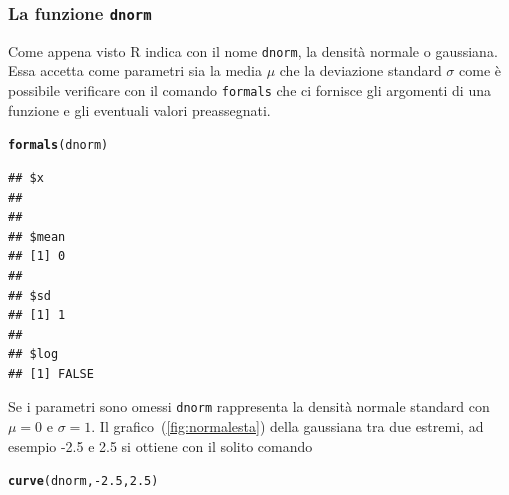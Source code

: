 \documentclass[onecolumn,12pt]{book}\usepackage[]{graphicx}\usepackage[]{color}
\makeatletter
\newcommand{\hlnum}[1]{\textcolor[rgb]{0.686,0.059,0.569}{#1}}%
\newcommand{\hlopt}[1]{\textcolor[rgb]{0,0,0}{#1}}%
\newcommand{\hlstd}[1]{\textcolor[rgb]{0.345,0.345,0.345}{#1}}%
\newcommand{\hlkwd}[1]{\textcolor[rgb]{0.737,0.353,0.396}{\textbf{#1}}}%
\newenvironment{kframe}{%
 \def\at@end@of@kframe{}%
 \ifinner\ifhmode%
  \def\at@end@of@kframe{\end{minipage}}%
  \begin{minipage}{\columnwidth}%
 \fi\fi%
 \def\FrameCommand##1{\hskip\@totalleftmargin \hskip-\fboxsep
 \colorbox{shadecolor}{##1}\hskip-\fboxsep
     \hskip-\linewidth \hskip-\@totalleftmargin \hskip\columnwidth}%
 \MakeFramed {\advance\hsize-\width
   \@totalleftmargin\z@ \linewidth\hsize
   \@setminipage}}%
 {\par\unskip\endMakeFramed%
 \at@end@of@kframe}
\newenvironment{knitrout}{}{} %
\makeatother
\begin{document}
\subsubsection{La funzione \texttt{dnorm}}

Come appena visto \textsf{R }indica con il nome \texttt{dnorm}, la densit\`a normale o gaussiana. Essa accetta come parametri sia la media $\mu$ che la deviazione standard $\sigma$ come \`e possibile verificare con il comando \texttt{formals} che ci fornisce gli argomenti di una funzione e gli eventuali valori preassegnati.
\begin{knitrout}
\color{fgcolor}\begin{kframe}
\begin{alltt}
\hlkwd{formals}\hlstd{(dnorm)}
\end{alltt}
\begin{verbatim}
## $x
## 
## 
## $mean
## [1] 0
## 
## $sd
## [1] 1
## 
## $log
## [1] FALSE
\end{verbatim}
\end{kframe}
\end{knitrout}
Se i parametri sono omessi \texttt{dnorm} rappresenta la densit\`a normale standard con $\mu=0$ e $\sigma=1$.
Il grafico~(\ref{fig:normalesta}) della gaussiana
 tra due estremi, ad esempio -2.5 e 2.5 si ottiene con il solito comando
\begin{knitrout}
\color{fgcolor}\begin{kframe}
\begin{alltt}
\hlkwd{curve}\hlstd{(dnorm,}\hlopt{-}\hlnum{2.5}\hlstd{,}\hlnum{2.5}\hlstd{)}
\end{alltt}
\end{kframe}
\end{knitrout}
\end{document}

